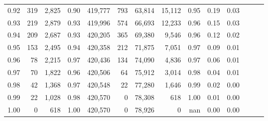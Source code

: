 \begin{tabular}{rrrrrrrrrrrrrr}
0.92 &    319 &  2,825 &  0.90 &  419,777 &      793 &  63,814 &  15,112 &  0.95 &  0.19 &      0.03 \\
0.93 &    219 &  2,879 &  0.93 &  419,996 &      574 &  66,693 &  12,233 &  0.96 &  0.15 &      0.03 \\
0.94 &    209 &  2,687 &  0.93 &  420,205 &      365 &  69,380 &   9,546 &  0.96 &  0.12 &      0.02 \\
0.95 &    153 &  2,495 &  0.94 &  420,358 &      212 &  71,875 &   7,051 &  0.97 &  0.09 &      0.01 \\
0.96 &     78 &  2,215 &  0.97 &  420,436 &      134 &  74,090 &   4,836 &  0.97 &  0.06 &      0.01 \\
0.97 &     70 &  1,822 &  0.96 &  420,506 &       64 &  75,912 &   3,014 &  0.98 &  0.04 &      0.01 \\
0.98 &     42 &  1,368 &  0.97 &  420,548 &       22 &  77,280 &   1,646 &  0.99 &  0.02 &      0.00 \\
0.99 &     22 &  1,028 &  0.98 &  420,570 &        0 &  78,308 &     618 &  1.00 &  0.01 &      0.00 \\
1.00 &      0 &    618 &  1.00 &  420,570 &        0 &  78,926 &       0 &   nan &  0.00 &      0.00 \\
\bottomrule
\end{tabular}
